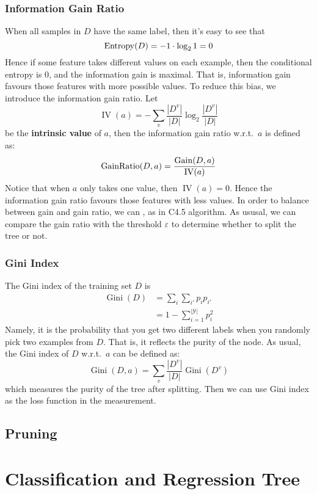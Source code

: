 \subsubsection{Information Gain Ratio}
When all samples in $D$ have the same label, then it's easy to see that
$$\operatorname{Entropy}(D) = - 1 \cdot \log_2 1 = 0$$
Hence if some feature takes different values on each example, then the conditional entropy is $0$, and the
information gain is maximal. That is, information gain favours those features with more possible values. To 
reduce this bias, we introduce the information gain ratio. Let 
$$\operatorname{IV}(a) = - \sum_v \frac{|D^v|}{|D|}\log_2\frac{|D^v|}{|D|}$$
be the \textbf{intrinsic value} of $a$, then the information gain ratio w.r.t.\ $a$ is defined as:
\begin{equation}
    \operatorname{GainRatio}(D, a) = \frac{\operatorname{Gain}(D, a)}{\operatorname{IV}(a)}
\end{equation}
Notice that when $a$ only takes one value, then $\operatorname{IV}(a) = 0$. Hence the information gain ratio
favours those features with less values. In order to balance between gain and gain ratio, we can 
, as
in C4.5 algorithm. As ususal, we can compare the gain ratio with the threshold $\varepsilon$ to determine
whether to split the tree or not.

\subsubsection{Gini Index}
The Gini index of the training set $D$ is
\begin{equation}
    \begin{split}
    \operatorname{Gini}(D) &= \sum_{i}\sum_{i'}p_i p_{i'}\\
                           &= 1 - \sum_{i=1}^{|\mathcal{Y}|} p_i^2
    \end{split}
\end{equation}
Namely, it is the probability that you get two different labels when you randomly pick two examples from $D$.
That is, it reflects the purity of the node. As usual, the Gini index of $D$ w.r.t.\ $a$ can be defined as:
\begin{equation}
    \operatorname{Gini}(D, a) = \sum_v \frac{|D^v|}{|D|}\operatorname{Gini}(D^v)
\end{equation}
which measures the purity of the tree after splitting. Then we can use Gini index as the loss function in the
measurement.


\subsection{Pruning}

\section{Classification and Regression Tree}